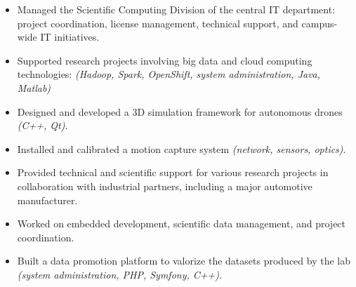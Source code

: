 \begin{itemize}
    \item Managed the Scientific Computing Division of the central IT department: project coordination, license management, technical support, and campus-wide IT initiatives.
    \item Supported research projects involving big data and cloud computing technologies: \textit{(Hadoop, Spark, OpenShift, system administration, Java, Matlab)}
\end{itemize}

\divider

\begin{itemize}
    \item Designed and developed a 3D simulation framework for autonomous drones \textit{(C++, Qt)}.
    \item Installed and calibrated a motion capture system \textit{(network, sensors, optics)}.
    \item Provided technical and scientific support for various research projects in collaboration with industrial partners, including a major automotive manufacturer.
    \item Worked on embedded development, scientific data management, and project coordination.
    \item Built a data promotion platform to valorize the datasets produced by the lab \textit{(system administration, PHP, Symfony, C++)}.
\end{itemize}
